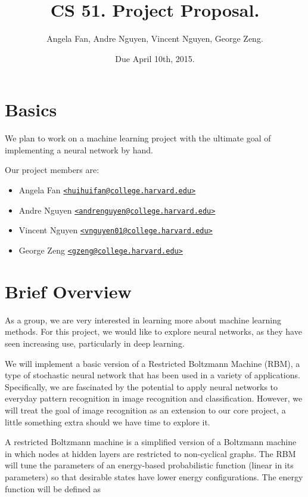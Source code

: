 \documentclass[12pt]{article}
\begin{document}
\title{CS 51. Project Proposal.}
\date{Due April 10th, 2015.}
\author{Angela Fan, Andre Nguyen, Vincent Nguyen, George Zeng.}
\maketitle

\section{Basics}
We plan to work on a machine learning project with the ultimate goal of implementing a neural network by hand.

Our project members are:
\begin{itemize}
  \item Angela Fan \href{mailto:huihuifan@college.harvard.edu}
    {\nolinkurl{<huihuifan@college.harvard.edu>}}
  \item Andre Nguyen \href{mailto:andrenguyen@college.harvard.edu}
    {\nolinkurl{<andrenguyen@college.harvard.edu>}}
  \item Vincent Nguyen \href{mailto:vnguyen01@college.harvard.edu}
    {\nolinkurl{<vnguyen01@college.harvard.edu>}}
  \item George Zeng \href{mailto:gzeng@college.harvard.edu}
    {\nolinkurl{<gzeng@college.harvard.edu>}}
\end{itemize}

\section{Brief Overview}
As a group, we are very interested in learning more about machine learning methods. For this project, we would like to explore neural networks, as they have seen increasing use, particularly in deep learning.

We will implement a basic version of a Restricted Boltzmann Machine (RBM), a type of stochastic neural network that has been used in a variety of applications. Specifically, we are fascinated by the potential to apply neural networks to everyday pattern recognition in image recognition and classification. However, we will treat the goal of image recognition as an extension to our core project, a little something extra should we have time to explore it. 

A restricted Boltzmann machine is a simplified version of a Boltzmann machine in which nodes at hidden layers are restricted to non-cyclical graphs. The RBM will tune the parameters of an energy-based probabilistic function (linear in its parameters) so that desirable states have lower energy configurations. The energy function will be defined as 
\end{document}

